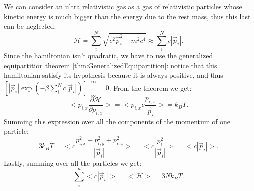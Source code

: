 \begin{example}
    We can consider an ultra relativistic gas as a gas of relativistic particles whose kinetic energy is much bigger than the energy due to the rest mass, thus this last can be neglected:
    \begin{equation*}
        \mathcal{H}= \sum_i^N\sqrt{c^2\vec p_i^2+m^2c^4}\approx\sum_i^N c|\vec p_i|.
    \end{equation*}
    Since the hamiltonian isn't quadratic, we have to use the generalized equipartition theorem \ref{thm:GeneralizedEquipartition}: notice that this hamiltonian satisfy its hypothesis because it is always positive, and thus $[|\vec p_i|\exp(-\beta\sum_i^N c|\vec p_i|)]_{-\infty}^{+\infty}=0$. From the theorem we get:
    \begin{equation*}
        \bigg<p_{i,x}\frac{\partial\mathcal{H} }{\partial p_{i,x}}\bigg>=\bigg<p_{i,x}c\frac{p_{i,x}}{|\vec p_i|}\bigg>=k_BT.
    \end{equation*}
    Summing this expression over all the components of the momentum of one particle:
    \begin{equation*}
        3k_BT=\bigg<c\frac{p^2_{i,x}+p^2_{i,y}+p^2_{i,z}}{|\vec p_i|}\bigg>=\bigg<c\frac{p^2_{i}}{|\vec p_i|}\bigg>=\big<c|\vec p_i|\big>.
    \end{equation*}
    Lastly, summing over all the particles we get:
    \begin{equation*}
        \sum_i^n\big<c|\vec p_i|\big>=\big<\mathcal{H} \big>=3Nk_BT.
    \end{equation*}
\end{example}
